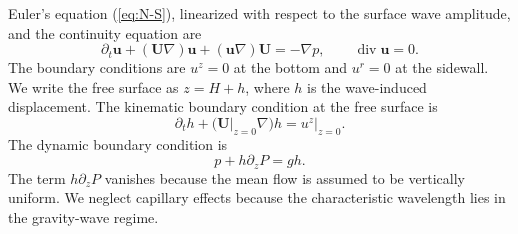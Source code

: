 \documentclass[aps,twocolumn]{revtex4-2}
\begin{document}
Euler's equation (\ref{eq:N-S}), linearized with respect to the surface wave amplitude, and the continuity equation are
\begin{equation}\label{linearized:001}
	\partial_t {\bm u}
	+
	({\bm U} \nabla) {\bm u}
	+
	({\bm u} \nabla){\bm U}
	=
	-\nabla p,
	\qquad
	\mathop{\mathrm{div}}{\bm u} = 0.
\end{equation}
The boundary conditions are $u^z = 0$ at the bottom and $u^r=0$ at the sidewall. We write the free surface as $z = H + h$, where $h$ is the wave-induced displacement. The kinematic boundary condition at the free surface is
\begin{equation}\label{BC:kinematic}
	\partial_t h + \big({\bm U}\vert_{z=0} \nabla\big) h
	=
	u^z\big\vert_{z=0}.
\end{equation}
The dynamic boundary condition is
\begin{equation}\label{BC:dynamic}
	p + h \partial_z P = gh.
\end{equation}
The term $h\partial_z P$ vanishes because the mean flow is assumed to be vertically uniform. We neglect capillary effects because the characteristic wavelength lies in the gravity-wave regime.
\end{document}
